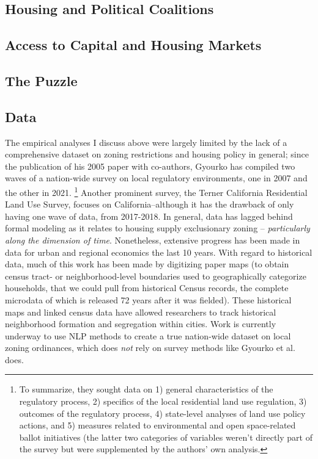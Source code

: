 \documentclass{article}[11pt]
\begin{document}
	\subsection{Housing and Political Coalitions}



	\subsection{Access to Capital and Housing Markets}


	\subsection{The Puzzle}


	\subsection{Data}
The empirical analyses I discuss above were largely limited by the lack of a comprehensive dataset on zoning restrictions and housing policy in general; since the publication of his 2005 paper with co-authors, Gyourko has compiled two waves of a nation-wide survey on local regulatory environments, one in 2007 and the other in 2021. \citep{gyourko2008new} \citep{gyourko2021local} \footnote{To summarize, they sought data on 1) general characteristics of the regulatory process, 2) specifics of the local residential land use regulation, 3) outcomes of the regulatory process, 4) state-level analyses of land use policy actions, and 5) measures related to environmental and open space-related ballot initiatives (the latter two categories of variables weren't directly part of the survey but were supplemented by the authors' own analysis.} Another prominent survey, the Terner California Residential Land Use Survey, focuses on California--although it has the drawback of only having one wave of data, from 2017-2018. \citep{mawhorter2018terner} In general, data has lagged behind formal modeling as it relates to housing supply exclusionary zoning -- \textit{particularly along the dimension of time}. \citep{gyourko2015regulation} Nonetheless, extensive progress has been made in data for urban and regional economics the last 10 years. \citep{newdata} With regard to historical data, much of this work has been made by digitizing paper maps (to obtain census tract- or neighborhood-level boundaries used to geographically categorize households, that we could pull from historical Census records, the complete microdata of which is released 72 years after it was fielded). These historical maps and linked census data have allowed researchers to track historical neighborhood formation and segregation within cities. Work is currently underway to use NLP methods to create a true nation-wide dataset on local zoning ordinances, which does \textit{not} rely on survey methods like Gyourko et al. does. \citep{bartik2024costs} 
\end{document}
